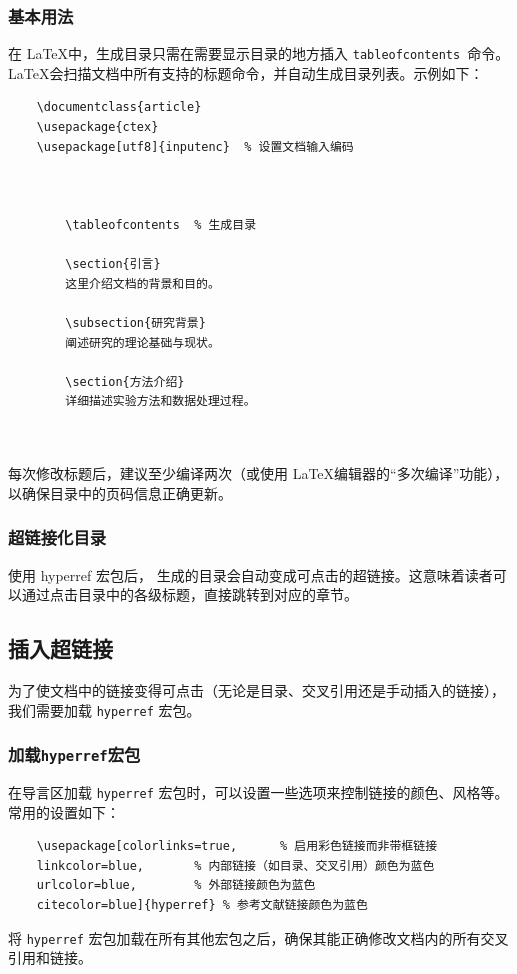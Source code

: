 \subsubsection{基本用法}
在 \LaTeX 中，生成目录只需在需要显示目录的地方插入 \texttt{tableofcontents }命令。\LaTeX 会扫描文档中所有支持的标题命令，并自动生成目录列表。示例如下：
\begin{lstlisting}
	\documentclass{article}
	\usepackage{ctex}
	\usepackage[utf8]{inputenc}  % 设置文档输入编码
	
	
		
		\tableofcontents  % 生成目录
		
		\section{引言}
		这里介绍文档的背景和目的。
		
		\subsection{研究背景}
		阐述研究的理论基础与现状。
		
		\section{方法介绍}
		详细描述实验方法和数据处理过程。
		
	
\end{lstlisting}
{}每次修改标题后，建议至少编译两次（或使用 \LaTeX 编辑器的“多次编译”功能），以确保目录中的页码信息正确更新。

\subsubsection{超链接化目录}
使用 hyperref 宏包后， 生成的目录会自动变成可点击的超链接。这意味着读者可以通过点击目录中的各级标题，直接跳转到对应的章节。

\subsection{插入超链接}
为了使文档中的链接变得可点击（无论是目录、交叉引用还是手动插入的链接），我们需要加载 \texttt{hyperref} 宏包。
\subsubsection{加载\texttt{hyperref}宏包}
在导言区加载 \texttt{hyperref} 宏包时，可以设置一些选项来控制链接的颜色、风格等。常用的设置如下：
\begin{lstlisting}
	\usepackage[colorlinks=true,      % 启用彩色链接而非带框链接
	linkcolor=blue,       % 内部链接（如目录、交叉引用）颜色为蓝色
	urlcolor=blue,        % 外部链接颜色为蓝色
	citecolor=blue]{hyperref} % 参考文献链接颜色为蓝色
\end{lstlisting}
将 \texttt{hyperref} 宏包加载在所有其他宏包之后，确保其能正确修改文档内的所有交叉引用和链接。

